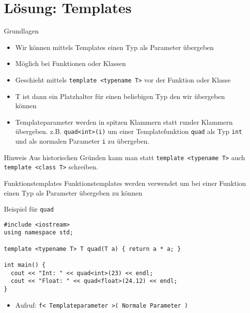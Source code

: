 \documentclass[presentation]{beamer}
\begin{document}
\section{Lösung: Templates}
\label{sec:org4051185}
\begin{frame}[fragile,label={sec:org2f75201}]{Grundlagen}
 \begin{itemize}
\item Wir können mittels Templates \alert{einen Typ als Parameter} übergeben
\item Möglich bei \alert{Funktionen} oder \alert{Klassen}
\item Geschieht mittels {\color{solarizedYellow}\texttt{template <typename T>} }vor der Funktion oder Klasse
\item T ist dann ein \alert{Platzhalter} für einen beliebigen Typ den wir übergeben können
\item Templateparameter werden in spitzen Klammern statt runder Klammern
übergeben. z.B. {\color{solarizedYellow}\texttt{quad<int>(i)} }um einer Templatefunktion {\color{solarizedYellow}\texttt{quad} }als
Typ {\color{solarizedYellow}\texttt{int} }und als normalen Parameter {\color{solarizedYellow}\texttt{i} }zu übergeben.
\end{itemize}
\begin{block}{Hinweis}
Aus historischen Gründen kann man statt {\color{solarizedYellow}\texttt{template <typename T>} }auch
{\color{solarizedYellow}\texttt{template <class T>} }schreiben.
\end{block}
\end{frame}
\begin{frame}[fragile,label={sec:org9d7c208}]{Funktionstemplates}
 Funktionstemplates werden verwendet um bei einer Funktion einen Typ
als Parameter übergeben zu können
\begin{exampleblock}{Beispiel für {\color{solarizedYellow}\texttt{quad}}}
\begin{verbatim}
#include <iostream>
using namespace std;

template <typename T> T quad(T a) { return a * a; }

int main() {
  cout << "Int: " << quad<int>(23) << endl;
  cout << "Float: " << quad<float>(24.12) << endl;
}
\end{verbatim}
\end{exampleblock}
\begin{itemize}
\item Aufruf: {\color{solarizedYellow}\texttt{f< Templateparameter >( Normale Parameter )}}
\end{itemize}
\end{frame}
\end{document}
